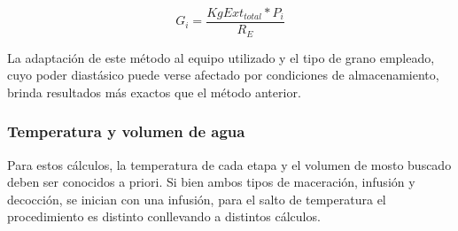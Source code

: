 \begin{itemize}
                    \begin{equation}
                        G_{i} = \frac{KgExt_{total} * P_{i}}{R_E}
                        \label{EcuacionCantidadGranoEmpirico}
                    \end{equation}
                    
                    \par La adaptación de este método al equipo utilizado y el tipo de grano empleado, cuyo poder diastásico puede verse afectado por condiciones de almacenamiento, brinda resultados más exactos que el método anterior.
                \end{itemize}
                
            \subsubsection{Temperatura y volumen de agua}
            \par Para estos cálculos, la temperatura de cada etapa y el volumen de mosto buscado deben ser conocidos a priori. Si bien ambos tipos de maceración, infusión y decocción, se inician con una infusión, para el salto de temperatura el procedimiento es distinto conllevando a distintos cálculos.
            

